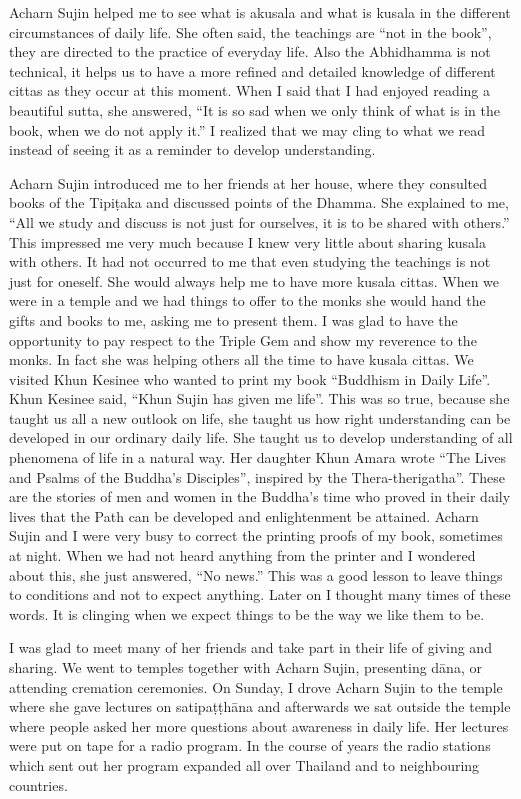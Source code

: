 Acharn Sujin helped me to see what is akusala and what is kusala in the different circumstances of daily life. She often said, the teachings are ``not in the book'', they are directed to the practice of everyday life. Also the Abhidhamma is not technical, it helps us to have a more refined and detailed knowledge of different cittas as they occur at this moment. When I said that I had enjoyed reading a beautiful sutta, she answered, ``It is so sad when we only think of what is in the book, when we do not apply it.'' I realized that we may cling to what we read instead of seeing it as a reminder to develop understanding.

Acharn Sujin introduced me to her friends at her house, where they consulted books of the Tipiṭaka and discussed points of the Dhamma. She explained to me, ``All we study and discuss is not just for ourselves, it is to be shared with others.'' This impressed me very much because I knew very little about sharing kusala with others. It had not occurred to me that even studying the teachings is not just for oneself. She would always help me to have more kusala cittas. When we were in a temple and we had things to offer to the monks she would hand the gifts and books to me, asking me to present them. I was glad to have the opportunity to pay respect to the Triple Gem and show my reverence to the monks. In fact she was helping others all the time to have kusala cittas. We visited Khun Kesinee who wanted to print my book ``Buddhism in Daily Life''. Khun Kesinee said, ``Khun Sujin has given me life''. This was so true, because she taught us all a new outlook on life, she taught us how right understanding can be developed in our ordinary daily life. She taught us to develop understanding of all phenomena of life in a natural way. Her daughter Khun Amara wrote ``The Lives and Psalms of the Buddha’s Disciples'', inspired by the Thera-therigatha''. These are the stories of men and women in the Buddha’s time who proved in their daily lives that the Path can be developed and enlightenment be attained.
Acharn Sujin and I were very busy to correct the printing proofs of my book, sometimes at night. When we had not heard anything from the printer and I wondered about this, she just answered, ``No news.'' This was a good lesson to leave things to conditions and not to expect anything. Later on I thought many times of these words. It is clinging when we expect things to be the way we like them to be.

I was glad to meet many of her friends and take part in their life of giving and sharing. We went to temples together with Acharn Sujin, presenting dāna, or attending cremation ceremonies. On Sunday, I drove Acharn Sujin to the temple where she gave lectures on satipaṭṭhāna and afterwards we sat outside the temple where people asked her more questions about awareness in daily life. Her lectures were put on tape for a radio program. In the course of years the radio stations which sent out her program expanded all over Thailand and to neighbouring countries.

